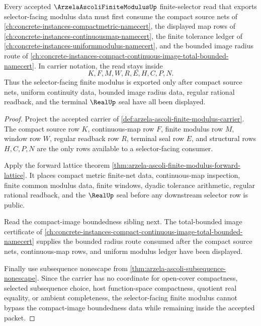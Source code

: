 \begin{theorem}
\label{thm:arzela-ascoli-finite-modulus-compact-image-bounded-dependency-route}
Every accepted $\ArzelaAscoliFiniteModulusUp$ finite-selector read that exports selector-facing modulus data must first consume the compact source nets of \autoref{ch:concrete-instances-compactmetric-namecert}, the displayed map rows of \autoref{ch:concrete-instances-continuousmap-namecert}, the finite tolerance ledger of \autoref{ch:concrete-instances-uniformmodulus-namecert}, and the bounded image radius route of \autoref{ch:concrete-instances-compact-continuous-image-total-bounded-namecert}. In carrier notation, the read stays inside
$$
K,F,M,W,R,E,H,C,P,N .
$$
Thus the selector-facing finite modulus is exported only after compact source nets, uniform continuity data, bounded image radius data, regular rational readback, and the terminal $\RealUp$ seal have all been displayed.
\end{theorem}
\begin{proof}
Project the accepted carrier of \autoref{def:arzela-ascoli-finite-modulus-carrier}. The compact source row $K$, continuous-map row $F$, finite modulus row $M$, window row $W$, regular readback row $R$, terminal seal row $E$, and structural rows $H,C,P,N$ are the only rows available to a selector-facing consumer.

Apply the forward lattice theorem \autoref{thm:arzela-ascoli-finite-modulus-forward-lattice}. It places compact metric finite-net data, continuous-map inspection, finite common modulus data, finite windows, dyadic tolerance arithmetic, regular rational readback, and the $\RealUp$ seal before any downstream selector row is public.

Read the compact-image boundedness sibling next. The total-bounded image certificate of \autoref{ch:concrete-instances-compact-continuous-image-total-bounded-namecert} supplies the bounded radius route consumed after the compact source nets, continuous-map rows, and uniform modulus ledger have been displayed.

Finally use subsequence nonescape from \autoref{thm:arzela-ascoli-subsequence-nonescape}. Since the carrier has no coordinate for open-cover compactness, selected subsequence choice, host function-space compactness, quotient real equality, or ambient completeness, the selector-facing finite modulus cannot bypass the compact-image boundedness data while remaining inside the accepted packet.
\end{proof}
